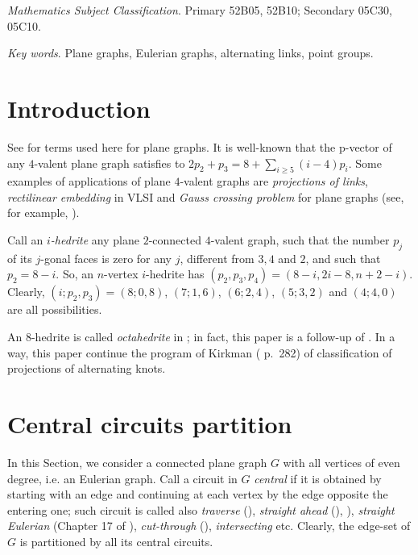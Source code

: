 \documentclass[12pt]{article}
\begin{document}
{\em Mathematics Subject Classification}. Primary 52B05, 52B10;
Secondary 05C30, 05C10.

{\em Key words}. Plane graphs, Eulerian graphs, alternating links, point groups.

\section{Introduction}

See \cite{Gr} for terms used here for plane graphs.
It is well-known that the p-vector of any $4$-valent plane graph satisfies to
$2p_2+p_3=8+ \sum_{i\geq 5} (i-4)p_i$.
Some examples of applications of plane $4$-valent graphs are {\em projections
of links}, {\em rectilinear embedding} in VLSI and {\em Gauss crossing 
problem} for plane graphs (see, for example, \cite{Liu}).

\vspace{2mm}


Call an {\em $i$-hedrite} any plane $2$-connected
$4$-valent graph, such that the number
$p_j$ of its $j$-gonal faces is zero for any $j$, different from 
$3,4$ and $2$, and such that $p_2=8-i$. So, 
an $n$-vertex $i$-hedrite has $(p_2, p_3, p_4)=(8-i, 2i-8, n+2-i)$.
Clearly, $(i;p_2,p_3)=(8;0,8)$, $(7;1,6)$, $(6;2,4)$,
$(5;3,2)$ and $(4;4,0)$ are all possibilities. 

An $8$-hedrite is called {\em octahedrite} in \cite{DSt}; in fact, this paper is a follow-up of \cite{DSt}.
In a way, this paper continue the program of Kirkman (\cite{Kirk} p.~282) of classification of projections of alternating knots.


















\section{Central circuits partition}

In this Section, we consider a connected plane graph $G$ with all vertices of 
even degree, i.e. an Eulerian graph. 
Call a circuit in $G$ {\it central} if it is obtained by starting with an
edge and continuing at each vertex by the edge opposite the entering one; such 
circuit is called also {\em traverse} 
(\cite{GK}), {\em straight ahead} (\cite{Ha}),  \cite{PTZ}), 
{\em straight Eulerian} (Chapter 17 of \cite{God}), 
{\em cut-through} (\cite{Je}),
{\em intersecting} etc. Clearly, the edge-set of 
$G$ is partitioned by all its central circuits.
\end{document}
